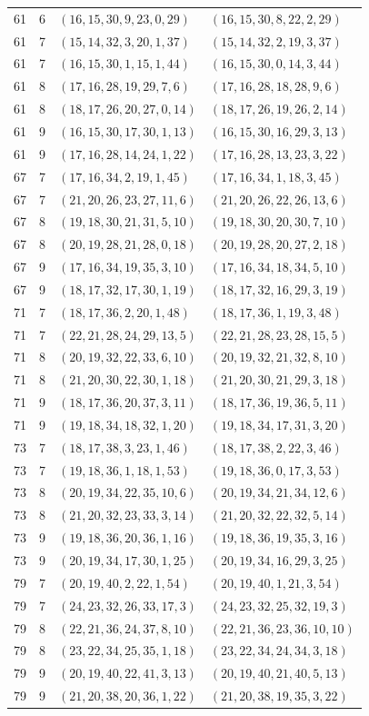 \begin{longtable}{rrll}
61&6&$(16,15,30,9,23,0,29)$&$(16,15,30,8,22,2,29)$\\
61&7&$(15,14,32,3,20,1,37)$&$(15,14,32,2,19,3,37)$\\
61&7&$(16,15,30,1,15,1,44)$&$(16,15,30,0,14,3,44)$\\
61&8&$(17,16,28,19,29,7,6)$&$(17,16,28,18,28,9,6)$\\
61&8&$(18,17,26,20,27,0,14)$&$(18,17,26,19,26,2,14)$\\
61&9&$(16,15,30,17,30,1,13)$&$(16,15,30,16,29,3,13)$\\
61&9&$(17,16,28,14,24,1,22)$&$(17,16,28,13,23,3,22)$\\
67&7&$(17,16,34,2,19,1,45)$&$(17,16,34,1,18,3,45)$\\
67&7&$(21,20,26,23,27,11,6)$&$(21,20,26,22,26,13,6)$\\
67&8&$(19,18,30,21,31,5,10)$&$(19,18,30,20,30,7,10)$\\
67&8&$(20,19,28,21,28,0,18)$&$(20,19,28,20,27,2,18)$\\
67&9&$(17,16,34,19,35,3,10)$&$(17,16,34,18,34,5,10)$\\
67&9&$(18,17,32,17,30,1,19)$&$(18,17,32,16,29,3,19)$\\
71&7&$(18,17,36,2,20,1,48)$&$(18,17,36,1,19,3,48)$\\
71&7&$(22,21,28,24,29,13,5)$&$(22,21,28,23,28,15,5)$\\
71&8&$(20,19,32,22,33,6,10)$&$(20,19,32,21,32,8,10)$\\
71&8&$(21,20,30,22,30,1,18)$&$(21,20,30,21,29,3,18)$\\
71&9&$(18,17,36,20,37,3,11)$&$(18,17,36,19,36,5,11)$\\
71&9&$(19,18,34,18,32,1,20)$&$(19,18,34,17,31,3,20)$\\
73&7&$(18,17,38,3,23,1,46)$&$(18,17,38,2,22,3,46)$\\
73&7&$(19,18,36,1,18,1,53)$&$(19,18,36,0,17,3,53)$\\
73&8&$(20,19,34,22,35,10,6)$&$(20,19,34,21,34,12,6)$\\
73&8&$(21,20,32,23,33,3,14)$&$(21,20,32,22,32,5,14)$\\
73&9&$(19,18,36,20,36,1,16)$&$(19,18,36,19,35,3,16)$\\
73&9&$(20,19,34,17,30,1,25)$&$(20,19,34,16,29,3,25)$\\
79&7&$(20,19,40,2,22,1,54)$&$(20,19,40,1,21,3,54)$\\
79&7&$(24,23,32,26,33,17,3)$&$(24,23,32,25,32,19,3)$\\
79&8&$(22,21,36,24,37,8,10)$&$(22,21,36,23,36,10,10)$\\
79&8&$(23,22,34,25,35,1,18)$&$(23,22,34,24,34,3,18)$\\
79&9&$(20,19,40,22,41,3,13)$&$(20,19,40,21,40,5,13)$\\
79&9&$(21,20,38,20,36,1,22)$&$(21,20,38,19,35,3,22)$\\
\bottomrule\end{longtable}\normalsize
